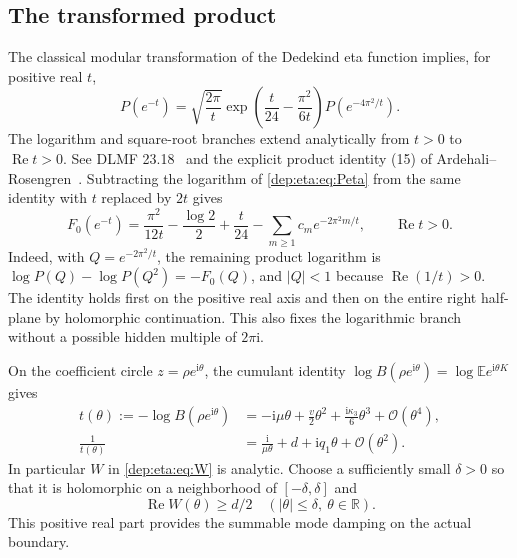 \documentclass[11pt]{article}
\theoremstyle{definition}\newtheorem{definition}[theorem]{Definition}
\theoremstyle{remark}\newtheorem{remark}[theorem]{Remark}
\newcommand{\OO}{\mathcal O}
\newcommand{\EE}{\mathbb E}
\newcommand{\ii}{\mathrm i}
\DeclareMathOperator{\Rea}{Re}
\begin{document}
\subsection{The transformed product}
The classical modular transformation of the Dedekind eta function
implies, for positive real $t$,
\begin{equation}\label{dep:eta:eq:Peta}
 P(e^{-t})=\sqrt{\frac{2\pi}{t}}
    \exp\left(\frac t{24}-\frac{\pi^2}{6t}\right)
    P(e^{-4\pi^2/t}).
\end{equation}
The logarithm and square-root branches extend analytically from
$t>0$ to $\Rea t>0$. See DLMF 23.18~\cite{eta} and the explicit
product identity (15) of Ardehali--Rosengren~\cite{ardehali}.
Subtracting the logarithm of \eqref{dep:eta:eq:Peta} from the same identity
with $t$ replaced by $2t$ gives
\begin{equation}\label{dep:eta:eq:etaexact}
 F_0(e^{-t})=\frac{\pi^2}{12t}-\frac{\log2}{2}+\frac t{24}
                 -\sum_{m\ge1}c_m e^{-2\pi^2m/t},\qquad \Rea t>0.
\end{equation}
Indeed, with $Q=e^{-2\pi^2/t}$, the remaining product logarithm is
$\log P(Q)-\log P(Q^2)=-F_0(Q)$, and $|Q|<1$ because
$\Rea(1/t)>0$. The identity holds first on the positive real axis and
then on the entire right half-plane by holomorphic continuation. This
also fixes the logarithmic branch without a possible hidden multiple
of $2\pi\ii$.

On the coefficient circle $z=\rho e^{\ii\theta}$, the cumulant identity
$\log B(\rho e^{\ii\theta})=\log\EE e^{\ii\theta K}$ gives
\begin{align}
 t(\theta):=-\log B(\rho e^{\ii\theta})
  &=-\ii\mu\theta+\frac v2\theta^2
           +\frac{\ii\kappa_3}{6}\theta^3+\OO(\theta^4),\label{dep:eta:eq:texpand}\\
 \frac1{t(\theta)}
  &=\frac{\ii}{\mu\theta}+d+\ii q_1\theta+\OO(\theta^2).
 \label{dep:eta:eq:invtexpand}
\end{align}
In particular $W$ in \eqref{dep:eta:eq:W} is analytic. Choose a sufficiently
small $\delta>0$ so that it is holomorphic on a neighborhood of
$[-\delta,\delta]$ and
\begin{equation}\label{dep:eta:eq:Wpositive}
 \Rea W(\theta)\ge d/2\quad (|\theta|\le\delta,\ \theta\in\mathbb R).
\end{equation}
This positive real part provides the summable mode damping on the
actual boundary.
\end{document}
